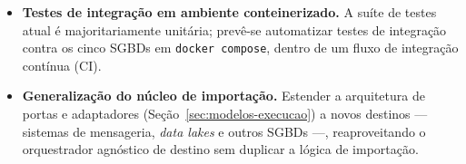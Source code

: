 \begin{itemize}
  \item \textbf{Testes de integração em ambiente conteinerizado.} A suíte de testes atual é
        majoritariamente unitária; prevê-se automatizar testes de integração contra os cinco
        SGBDs em \texttt{docker compose}, dentro de um fluxo de integração contínua (CI).

  \item \textbf{Generalização do núcleo de importação.} Estender a arquitetura de portas e
        adaptadores (Seção~\ref{sec:modelos-execucao}) a novos destinos --- sistemas de
        mensageria, \textit{data lakes} e outros SGBDs ---, reaproveitando o orquestrador
        agnóstico de destino sem duplicar a lógica de importação.
\end{itemize}
